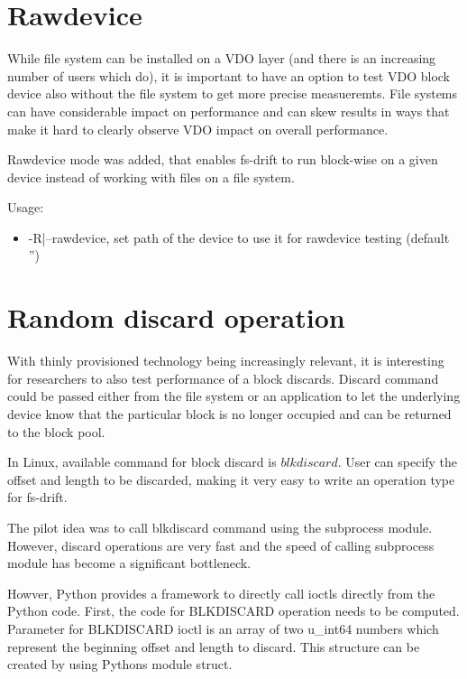 \documentclass[
  color, %
  table, %
  lof,   %
  lot,   %
]{fithesis3}
\begin{document}
\section{Rawdevice}
While file system can be installed on a VDO layer (and there is an increasing number of users which do), it is important to have an option to test VDO block device also without the file system to get more precise measueremts. File systems can have considerable impact on performance and can skew results in ways that make it hard to clearly observe VDO impact on overall performance.

Rawdevice mode was added, that enables fs-drift to run block-wise on a given device instead of working with files on a file system.

Usage:
\begin{itemize}
    \item -R|--rawdevice, set path of the device to use it for rawdevice testing (default '')
\end{itemize}


\section{Random discard operation}
With thinly provisioned technology being increasingly relevant, it is interesting for researchers to also test performance of a block discards. Discard command could be passed either from the file system or an application to let the underlying device know that the particular block is no longer occupied and can be returned to the block pool.

In Linux, available command for block discard is $blkdiscard$. User can specify the offset and length to be discarded, making it very easy to write an operation type for fs-drift.

The pilot idea was to call blkdiscard command using the subprocess module. However, discard operations are very fast and the speed of calling subprocess module has become a significant bottleneck.

Howver, Python provides a framework to directly call ioctls directly from the Python code. First, the code for BLKDISCARD operation needs to be computed. Parameter for BLKDISCARD ioctl is an array of two u\_int64 numbers which represent the beginning offset and length to discard. This structure can be created by using Pythons module struct.



\end{document}
